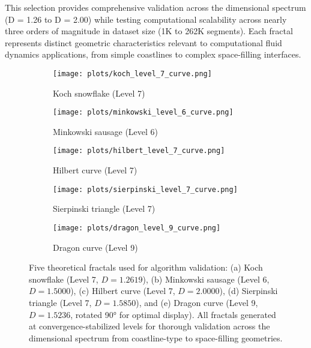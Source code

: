 \documentclass[preprint,12pt]{elsarticle}
\begin{document}
This selection provides comprehensive validation across the dimensional spectrum (D = 1.26 to D = 2.00) while testing computational scalability across nearly three orders of magnitude in dataset size (1K to 262K segments). Each fractal represents distinct geometric characteristics relevant to computational fluid dynamics applications, from simple coastlines to complex space-filling interfaces.

\begin{figure}[H]
\centering
\vspace{-0.5cm}
\begin{subfigure}[b]{0.45\textwidth}
    \centering
    \texttt{[image: plots/koch\_level\_7\_curve.png]}
    \caption{Koch snowflake (Level 7)}
    \label{fig:koch_fractal}
\end{subfigure}
\hfill
\begin{subfigure}[b]{0.45\textwidth}
    \centering
    \texttt{[image: plots/minkowski\_level\_6\_curve.png]}
    \caption{Minkowski sausage (Level 6)}
    \label{fig:minkowski_fractal}
\end{subfigure}
\vspace{0.3cm}
\begin{subfigure}[b]{0.45\textwidth}
    \centering
    \texttt{[image: plots/hilbert\_level\_7\_curve.png]}
    \caption{Hilbert curve (Level 7)}
    \label{fig:hilbert_fractal}
\end{subfigure}
\hfill
\begin{subfigure}[b]{0.45\textwidth}
    \centering
    \texttt{[image: plots/sierpinski\_level\_7\_curve.png]}
    \caption{Sierpinski triangle (Level 7)}
    \label{fig:sierpinski_fractal}
\end{subfigure}
\vspace{0.3cm}
\begin{subfigure}[b]{0.45\textwidth}
    \centering
    \texttt{[image: plots/dragon\_level\_9\_curve.png]}
    \caption{Dragon curve (Level 9)}
    \label{fig:dragon_fractal}
\end{subfigure}

\vspace{0.3cm}

\vspace{-0.3cm}
\caption{\small Five theoretical fractals used for algorithm validation: (a) Koch snowflake (Level 7, $D = 1.2619$), (b) Minkowski sausage (Level 6, $D = 1.5000$), (c) Hilbert curve (Level 7, $D = 2.0000$), (d) Sierpinski triangle (Level 7, $D = 1.5850$), and (e) Dragon curve (Level 9, $D = 1.5236$, rotated 90° for optimal display). All fractals generated at convergence-stabilized levels for thorough validation across the dimensional spectrum from coastline-type to space-filling geometries.}
\label{fig:five_fractals}
\vspace{-0.5cm}
\end{figure}
\end{document}
